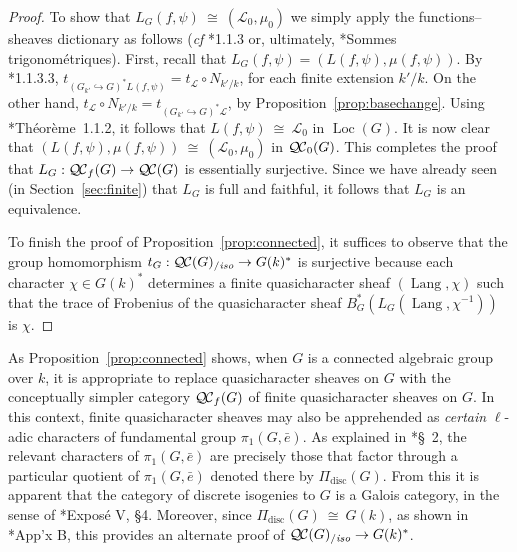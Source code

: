 \documentclass[11pt]{amsart}
\theoremstyle{plain}
\theoremstyle{definition}
\theoremstyle{remark}
\newcommand{\bFq}{\bar{k}}
\newcommand{\Fq}{k}
\DeclareMathOperator{\Gal}{Gal}
\newcommand{\iso}{{\ \cong\ }}
\newcommand{\cs}[1]{{\mathcal{#1}}}
\newcommand{\QC}{{\mathcal{Q\hskip-0.8pt C}}}
\newcommand{\QCb}{{\QC_0}}
\newcommand{\QCf}{{\QC_f}}
\newcommand{\QCiso}[1]{\QC(#1)_{/\textit{iso}}}
\newcommand{\Lang}{{\operatorname{Lang}}}
\newcommand{\Loc}{{\operatorname{Loc}}}
\newcommand{\trFrob}[1]{t_{#1}}
\begin{document}
\begin{proof}
  To show that $L_G(f,\psi) \iso (\cs{L}_0,\mu_0)$ we simply apply the functions--sheaves dictionary
  as follows ({\it cf} \cite{Laumon}*{1.1.3} or, ultimately, \cite{SGA4.5}*{Sommes trigonométriques}).
  First, recall that $L_G(f,\psi) = (L(f,\psi), \mu(f,\psi))$. 
  By  \cite{Laumon}*{1.1.3.3}, $\trFrob{(G_{k'}\hookrightarrow G)^*L(f,\psi)} = \trFrob{\cs{L}} \circ N_{k'/k}$, for each finite extension $k'/k$.
  On the other hand, $\trFrob{\cs{L}} \circ N_{k'/k} = \trFrob{(G_{k'}\hookrightarrow G)^*\cs{L}}$,  by Proposition~\ref{prop:basechange}.
  Using \cite{Laumon}*{Th\'eor\`eme~1.1.2}, it follows that  $L(f,\psi) \iso \cs{L}_0$ in $\Loc(G)$.
  It is now clear that $(L(f,\psi),\mu(f,\psi)) \iso (\cs{L}_0,\mu_0)$ in $\QCb(G)$.
  This completes the proof that $L_G : \QCf(G) \to \QC(G)$ is essentially surjective.
  Since we have already seen (in Section~\ref{sec:finite}) that $L_G$ is full and faithful, 
  it follows that $L_G$ is an equivalence.
  
  To finish the proof of Proposition~\ref{prop:connected}, it suffices to observe that the group homomorphism
  $
  \trFrob{G} : \QCiso{G} \to G(\Fq)^*
  $
  is surjective because each character $\chi \in G(\Fq)^*$ determines a finite quasicharacter sheaf $(\Lang,\chi)$ such that the trace of Frobenius of the quasicharacter sheaf $B_G^* (L_G(\Lang,\chi^{-1}))$ is $\chi$.
\end{proof}

As Proposition~\ref{prop:connected} shows, 
when $G$ is a connected algebraic group over $\Fq$, 
it is appropriate to replace quasicharacter sheaves on $G$ 
with the conceptually simpler category $\QCf(G)$ of finite quasicharacter sheaves on $G$. 
In this context, finite quasicharacter sheaves may also be apprehended as \emph{certain} $\ell$-adic characters of fundamental group $\pi_1(G,{\bar e})$. 
As explained in \cite{Kamgarpour}*{\S~2}, 
the relevant characters of $\pi_1(G,{\bar e})$ are precisely those 
that factor through a particular quotient of $\pi_1(G,{\bar e})$ 
denoted there by $\Pi_\text{disc}(G)$.
From this it is apparent that the category of discrete isogenies to $G$ is a Galois category, in the sense of \cite{SGA1}*{Expos\'e V, \S 4}. Moreover, since $\Pi_\text{disc}(G) \iso G(\Fq)$, as shown in \cite{Kamgarpour}*{App'x B}, this provides an alternate proof of $\QCiso{G} \to G(\Fq)^*$.
\end{document}
